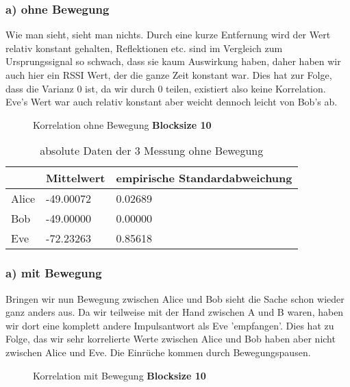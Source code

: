 \documentclass[12pt,a4paper]{article}
\begin{document}
\subsubsection*{a) ohne Bewegung}
Wie man sieht, sieht man nichts. Durch eine kurze Entfernung wird der Wert relativ konstant gehalten, Reflektionen etc. sind im Vergleich zum Ursprungssignal so schwach, dass sie kaum Auswirkung haben, daher haben wir auch hier ein RSSI Wert, der die ganze Zeit konstant war. Dies hat zur Folge, dass die Varianz 0 ist, da wir durch 0 teilen, existiert also keine Korrelation. Eve's Wert war auch relativ konstant aber weicht dennoch leicht von Bob's ab.
\begin{figure}[H]
\centering
{} \qquad
{}
\caption{Korrelation ohne Bewegung \textbf{Blocksize 10}}
\label{fig:3_a_o}
\end{figure}
\begin{table}[H]
\centering
\begin{tabular}{l|l|l}
& Mittelwert & empirische Standardabweichung \\
\hline
Alice & -49.00072 & 0.02689 \\
\hline
Bob & -49.00000 & 0.00000 \\
\hline
Eve & -72.23263 & 0.85618 \\
\hline
\end{tabular}
\caption{absolute Daten der 3 Messung ohne Bewegung}
\end{table}

\subsubsection*{a) mit Bewegung}
Bringen wir nun Bewegung zwischen Alice und Bob sieht die Sache schon wieder ganz anders aus. Da wir teilweise mit der Hand zwischen A und B waren, haben wir dort eine komplett andere Impulsantwort als Eve 'empfangen'. Dies hat zu Folge, das wir sehr korrelierte Werte zwischen Alice und Bob haben aber nicht zwischen Alice und Eve. Die Einrüche kommen durch Bewegungspausen.
\begin{figure}[H]
\centering
{} \qquad
{}
\caption{Korrelation mit Bewegung \textbf{Blocksize 10}}
\label{fig:3_a_m}
\end{figure}
\end{document}

